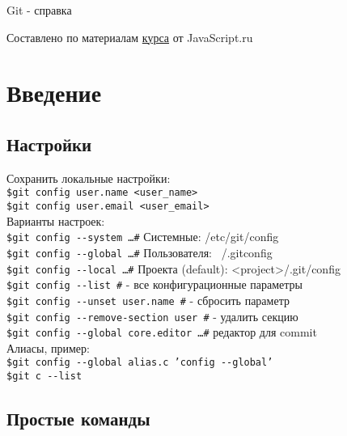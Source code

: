 \documentclass[12pt, a4paper]{article}
\begin{document}
		
\begin{center} {\Huge Git - справка} \end{center}

Составлено по материалам 
\href{https://www.youtube.com/watch?v=W4hoc24K93E&list=PLDyvV36pndZFHXjXuwA_NywNrVQO0aQqb}{курса} от JavaScript.ru \\


\section{Введение}

\subsection{Настройки}

Сохранить локальные настройки: \\
\indent \texttt{\$git config user.name <user\_name>} \\
\indent \texttt{\$git config user.email <user\_email>} \\

\noindent Варианты настроек: \\
\indent \texttt{\$git config {-}-system \ldots \indent \#} Системные: /etc/git/config \\
\indent \texttt{\$git config {-}-global \ldots \indent \#} Пользователя: ~/.gitconfig \\
\indent \texttt{\$git config {-}-local \ldots \indent \#}  Проекта (default):	<project>/.git/config \\

\noindent\texttt{\$git config {-}-list \indent \#} - все конфигурационные параметры \\
\texttt{\$git config {-}-unset user.name \indent \#} - сбросить параметр \\ 
\texttt{\$git config {-}-remove-section user \indent \#} - удалить секцию \\ 
\texttt{\$git config {-}-global core.editor \ldots \indent \#} редактор для commit \\
	
\noindent Алиасы, пример: \\
\indent\texttt{\$git config {-}-global alias.c 'config {-}-global'} \\
\indent\texttt{\$git c {-}-list}


\subsection{Простые команды}
\end{document}
